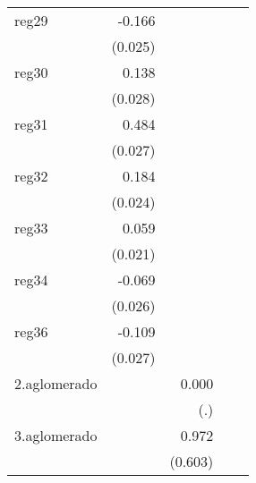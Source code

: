{\begin{longtable}{l*{4}{D{.}{.}{-1}}}
\addlinespace
reg29       &      -0.166\sym{***}&                     &                     &                     \\
            &     (0.025)         &                     &                     &                     \\
\addlinespace
reg30       &       0.138\sym{***}&                     &                     &                     \\
            &     (0.028)         &                     &                     &                     \\
\addlinespace
reg31       &       0.484\sym{***}&                     &                     &                     \\
            &     (0.027)         &                     &                     &                     \\
\addlinespace
reg32       &       0.184\sym{***}&                     &                     &                     \\
            &     (0.024)         &                     &                     &                     \\
\addlinespace
reg33       &       0.059\sym{**} &                     &                     &                     \\
            &     (0.021)         &                     &                     &                     \\
\addlinespace
reg34       &      -0.069\sym{**} &                     &                     &                     \\
            &     (0.026)         &                     &                     &                     \\
\addlinespace
reg36       &      -0.109\sym{***}&                     &                     &                     \\
            &     (0.027)         &                     &                     &                     \\
\addlinespace
2.aglomerado&                     &       0.000         &                     &                     \\
            &                     &         (.)         &                     &                     \\
\addlinespace
3.aglomerado&                     &       0.972         &                     &                     \\
            &                     &     (0.603)         &                     &                     \\

\end{longtable}}
